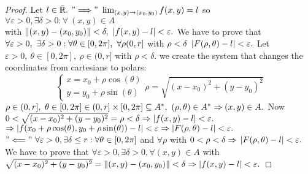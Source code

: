 \documentclass{article}
\begin{document}
    \begin{proof}
        Let $l \in \bar{\mathbb{R}}. \\$
        $"\Longrightarrow" \ \lim_{(x,y) \to (x_0, y_0)} f(x,y) = l$ so $\forall \varepsilon > 0, \exists \delta > 0: \forall \ (x,y) \in A$ \\ with $\left\lVert (x,y) - (x_0,y_0)\right\rVert < \delta, \ \left\lvert f(x,y) - l \right\rvert < \varepsilon. \\ \\$
        We have to prove that $\forall \varepsilon > 0, \ \exists \delta > 0 : \forall \theta \in [0,2\pi], \ \forall \rho (0,r] \\$ with $\rho < \delta \ \left\lvert F(\rho, \theta) - l\right\rvert < \varepsilon. \\$
        Let $\varepsilon > 0, \ \theta \in [0,2\pi], \ \rho \in (0,r]$ with $\rho < \delta.$ we create the system that changes the coordinates from cartesians to polars:
        \begin{equation*}
            \begin{cases}
                x = x_0 + \rho \cos(\theta) \\
                y = y_0 + \rho \sin(\theta) 
            \end{cases} \rho = \sqrt{(x - x_0)^2 + (y - y_0)^2} 
        \end{equation*}
        $\rho \in (0,r], \ \theta \in [0,2\pi] \in (0,r] \times [0,2\pi] \subseteq A^*, \ (\rho,\theta) \in A^* \Rightarrow (x,y) \in A. \\ \\$ 
        Now $ 0 < \sqrt{(x - x_0)^2 + (y - y_0)^2} = \rho < \delta \Rightarrow \left\lvert f(x,y) - l \right\rvert < \varepsilon. \\ $
        $\Rightarrow \left\lvert f(x_0 + \rho \cos(\theta), y_0 + \rho \sin(\theta)) - l \right\rvert < \varepsilon \Rightarrow \left\lvert F(\rho, \theta) - l \right\rvert < \varepsilon. \\ \\$
        $"\Longleftarrow" \ \forall \varepsilon > 0, \exists \delta \leq r : \forall \theta \in [0,2\pi]$ and $\forall \rho$ with $ 0 < \rho < \delta \Rightarrow \\ \left\lvert F(\rho, \theta) - l \right\rvert < \varepsilon. \\$
        We have to prove that $\forall \varepsilon > 0, \exists \delta > 0, \forall (x,y) \in A$ with \\ $ \sqrt{(x - x_0)^2 + (y - y_0)^2} = \left\lVert (x,y) - (x_0,y_0) \right\rVert  < \delta \Rightarrow \left\lvert f(x,y) - l \right\rvert < \varepsilon. \\ \\$

\end{proof}
\end{document}
